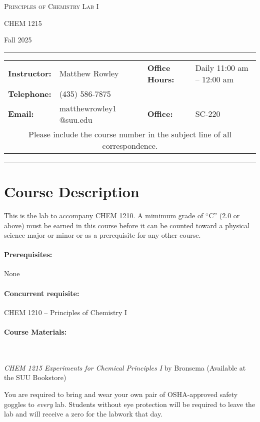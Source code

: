 \documentclass[12pt, letterpaper]{article}
\begin{document}
\begin{center}
	{\Large \textsc{Principles of Chemistry Lab I}}

	CHEM 1215
\end{center}

\begin{center}
	{\large Fall 2025}
\end{center}
\begin{center}
	\rule{0.99\textwidth}{0.4pt}
	\begin{tabular}{llcll}
		\textbf{Instructor:} & Matthew Rowley           &  & \textbf{Office Hours:} & Daily 11:00 am -- 12:00 am \\
		\textbf{Telephone:}  & (435) 586-7875           &  &                        &  \\
		\textbf{Email:}      & matthewrowley$1$@suu.edu &  & \textbf{Office:}       & SC-220                   \\
		\multicolumn{5}{c}{Please include the course number in the subject line of all correspondence.}
	\end{tabular}
	\rule{0.99\textwidth}{0.4pt}
\end{center}

\section*{Course Description}
This is the lab to accompany CHEM 1210. A mimimum grade of ``C'' (2.0 or above) must be earned in this course before it can be counted toward a physical science major or minor or as a prerequisite for any other course.

\paragraph{Prerequisites:}
None

\paragraph{Concurrent requisite:}
CHEM 1210 -- Principles of Chemistry I

\paragraph{Course Materials:} ~

\emph{CHEM 1215 Experiments for Chemical Principles I} by Bronsema (Available at the SUU Bookstore)

You are required to bring and wear your own pair of OSHA-approved safety goggles to \emph{every} lab. Students without eye protection will be required to leave the lab and will receive a zero for the labwork that day.
\end{document}
